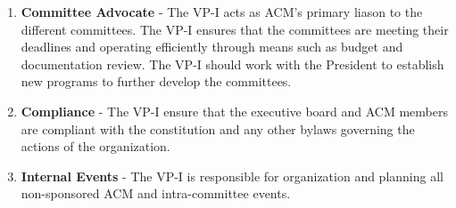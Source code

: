\documentclass[11pt,a4paper,notitlepage]{article}
\begin{document}
\begin{enumerate}[label=\Alph*.]
\begin{enumerate}[label=\arabic*.]
\begin{enumerate}[label=\alph*.]
          \item \textbf{Committee Advocate} - The VP-I acts as ACM's primary
            liason to the different committees. The VP-I ensures that the
            committees are meeting their deadlines and operating efficiently
            through means such as budget and documentation review. The VP-I
            should work with the President to establish new programs to further
            develop the committees.
          \item \textbf{Compliance} - The VP-I ensure that the executive board
            and ACM members are compliant with the constitution and any other
            bylaws governing the actions of the organization.
          \item \textbf{Internal Events} - The VP-I is responsible for
            organization and planning all non-sponsored ACM and intra-committee
            events.
        \end{enumerate}


\end{enumerate}
\end{enumerate}
\end{document}
